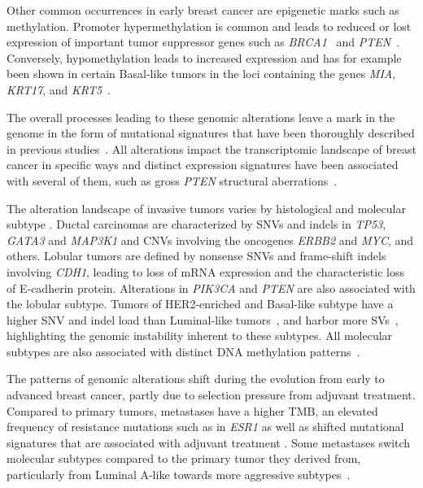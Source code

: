\documentclass[11pt]{book}
\begin{document}
Other common occurrences in early breast cancer are epigenetic marks such as methylation. Promoter hypermethylation is common and leads to reduced or lost expression of important tumor suppressor genes such as \textit{BRCA1}~\cite{Esteller:2000, Glodzik:2020} and \textit{PTEN}~\cite{Zhang:2013}. Conversely, hypomethylation leads to increased expression and has for example been shown in certain Basal-like tumors in the loci containing the genes \textit{MIA}, \textit{KRT17}, and \textit{KRT5}~\cite{Bardowell:2013}.

The overall processes leading to these genomic alterations leave a mark in the genome in the form of mutational signatures that have been thoroughly described in previous studies~\cite{Nik-Zainal:2012b, Alexandrov:2013, Morganella:2016, Glodzik:2017}. All alterations impact the transcriptomic landscape of breast cancer in specific ways and distinct expression signatures have been associated with several of them, such as gross \textit{PTEN} structural aberrations~\cite{Saal:2007}.

The alteration landscape of invasive tumors varies by histological and molecular subtype \cite{Ciriello:2015}. Ductal carcinomas are characterized by SNVs and indels in \textit{TP53}, \textit{GATA3} and \textit{MAP3K1} and CNVs involving the oncogenes \textit{ERBB2} and \textit{MYC}, and others. Lobular tumors are defined by nonsense SNVs and frame-shift indels involving \textit{CDH1}, leading to loss of mRNA expression and the characteristic loss of E-cadherin protein. Alterations in \textit{PIK3CA} and \textit{PTEN} are also associated with the lobular subtype.
Tumors of HER2-enriched and Basal-like subtype have a higher SNV and indel load than Luminal-like tumors~\cite{TCGA-Breast:2012}, and harbor more SVs~\cite{Banerji:2012, Fimereli:2018}, highlighting the genomic instability inherent to these subtypes. All molecular subtypes are also associated with distinct DNA methylation patterns~\cite{Holm:2010}.

The patterns of genomic alterations shift during the evolution from early to advanced breast cancer, partly due to selection pressure from adjuvant treatment. Compared to primary tumors, metastases have a higher TMB, an elevated frequency of resistance mutations such as in \textit{ESR1} \cite{Toy:2013} as well as shifted mutational signatures that are associated with adjuvant treatment \cite{Angus:2019}. Some metastases switch molecular subtypes compared to the primary tumor they derived from, particularly from Luminal A-like towards more aggressive subtypes~\cite{Priedigkeit:2017, Cejalvo:2017, Klebe:2020}.
\end{document}
